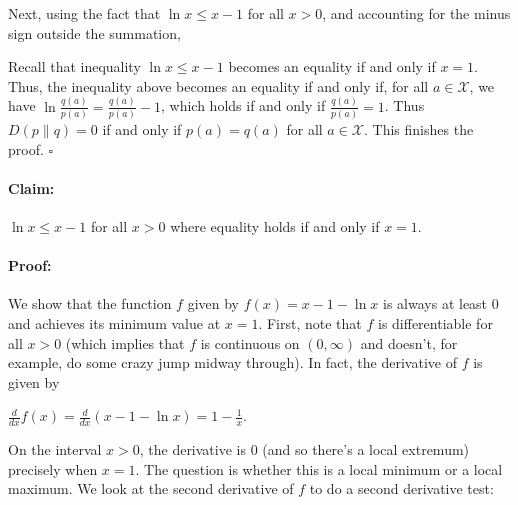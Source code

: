 \documentclass[6008notes.tex]{subfiles}
\begin{document}
Next, using the fact that $\ln x\le x-1$ for all $x>0$, and accounting for the minus sign outside the summation,

{ \par}
			
Recall that inequality $\ln x\le x-1$ becomes an equality if and only if $x=1$. Thus, the inequality above becomes an equality if and only if, for all $a\in \mathcal{X}$, we have $\ln \frac{q(a)}{p(a)}=\frac{q(a)}{p(a)}-1$, which holds if and only if $\frac{q(a)}{p(a)}=1$. Thus $D(p\parallel q)=0$ if and only if $p(a)=q(a)$ for all $a\in \mathcal{X}$. This finishes the proof. $\square$

\paragraph{Claim:} $\ln x\le x-1$ for all $x>0$ where equality holds if and only if $x=1$.

\paragraph{Proof:} We show that the function $f$ given by $f(x)=x-1-\ln x$ is always at least 0 and achieves its minimum value at $x=1$. First, note that $f$ is differentiable for all $x>0$ (which implies that $f$ is continuous on $(0,\infty)$ and doesn't, for example, do some crazy jump midway through). In fact, the derivative of $f$ is given by

{\centering$\frac{d}{dx}f(x)=\frac{d}{dx}(x-1-\ln x)=1-\frac{1}{x}.$ \par}
 
On the interval $x>0$, the derivative is 0 (and so there's a local extremum) precisely when $x=1$. The question is whether this is a local minimum or a local maximum. We look at the second derivative of $f$ to do a second derivative test:
\end{document}
